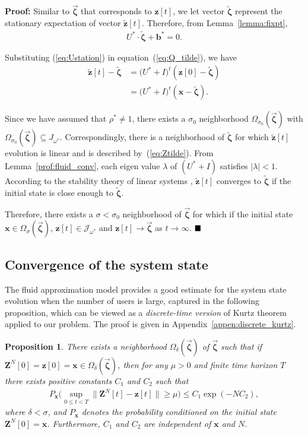 \documentclass[11pt,twocolumn]{IEEEtran}
\newtheorem{proposition}{Proposition}
\begin{document}
\noindent \textbf{Proof:} Similar to $\vec{\bm \zeta}$ that corresponds to ${\bm z}[t]$, we let vector ${\tilde{\bm \zeta}}$ represent the stationary expectation of vector $\tilde{\bm z}[t]$. Therefore, from Lemma~\ref{lemma:fixpt},
\begin{align}
U^* \cdot {\tilde{\bm \zeta}} + \bm b^*=0. \label{eq:Ustation}
\end{align}

Substituting (\ref{eq:Ustation}) in equation~(\ref{eq:Q_tilde}), we have
\begin{align}
\tilde{\bm z}[t]- \tilde{\bm \zeta}&=(U^*+I\big)^{t} (\bm z[0]- {\tilde{\bm \zeta}})\nonumber\\
&=(U^*+I\big)^{t} (\bm x- {\tilde{\bm \zeta}}). \label{eq:Ztilde}
\end{align}

Since we have assumed that $\rho^*\neq 1$, there exists a $\sigma_0$ neighborhood $\Omega_{\sigma_0}(\vec{\bm \zeta})$ with $\Omega_{\sigma_0}(\vec{\bm \zeta}) \subseteq J_{\omega^*}$. Correspondingly, there is a neighborhood of $\tilde{\bm \zeta}$ for which $\tilde{\bm z}[t]$ evolution is linear and is described by~(\ref{eq:Ztilde}). From Lemma~\ref{prof:fluid_conv}, each eigen value $\lambda$ of $(U^*+I)$ satisfies $\big|\lambda\big|<1$. According to the stability theory of linear systems \cite{Khalil}, $\tilde{\bm z}[t]$ converges to $\tilde{\bm \zeta}$ if the initial state is close enough to $\tilde{\bm \zeta}$.

Therefore, there exists a $\sigma<\sigma_0$ neighborhood of $\vec{\bm \zeta}$ for which if the initial state $\bm x \in \Omega_{\sigma}(\vec{\bm \zeta})$, $\bm z[t] \in  \mathcal{J}_{\omega^*}$ and $\bm z[t] \rightarrow \vec{\bm \zeta}$ as $t \rightarrow \infty$. $\hfill \blacksquare$

\subsection{Convergence of the system state}

The fluid approximation model provides a good estimate for the system state evolution when the number of users is large, captured in the following proposition, which can be viewed as a \emph{discrete-time version} of Kurtz theorem \cite{Kurtz} applied to our problem. The proof is given in Appendix~\ref{appen:discrete_kurtz}.

\begin{proposition}
\label{prop:discrete_kurtz}
There exists a neighborhood $\Omega_{\delta}(\vec{\bm \zeta})$ of $\vec{\bm \zeta}$ such that if $\bm Z^{N}[0]{=}\bm z[0]{=}\bm x \in \Omega_{\delta}(\vec{\bm \zeta})$, then for any $\mu>0$ and finite time horizon $T$ there exists positive constants $C_1$ and $C_2$ such that
\begin{align}
P_{\bm x}\Big( \sup_{0 \leq t < T} \big\| \bm Z^{N}[t]-\bm z[t] \big\| \geq \mu \Big)\leq C_1 \exp(-N C_2), \nonumber
\end{align}
where $\delta<\sigma$, and $P_{\bm x}$ denotes the probability conditioned on the initial state $\bm Z^{N}[0]=\bm x$. Furthermore, $C_1$ and $C_2$ are independent of $\bm x$ and $N$.
\end{proposition}
\end{document}
